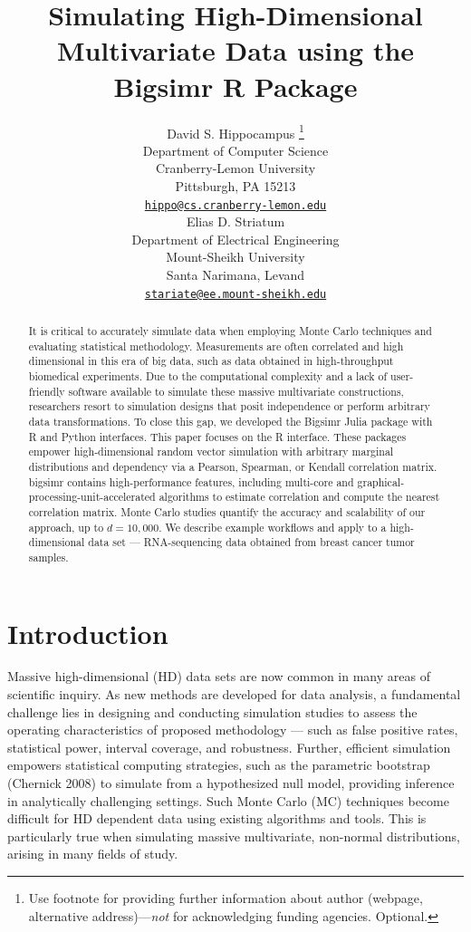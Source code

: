 \documentclass{article}
\title{Simulating High-Dimensional Multivariate Data using the Bigsimr R
Package}
\author{
    David S. Hippocampus
    \thanks{Use footnote for providing further information about author
(webpage, alternative address)---\emph{not} for acknowledging funding
agencies. Optional.}
   \\
    Department of Computer Science \\
    Cranberry-Lemon University \\
  Pittsburgh, PA 15213 \\
  \texttt{\href{mailto:hippo@cs.cranberry-lemon.edu}{\nolinkurl{hippo@cs.cranberry-lemon.edu}}} \\
   \And
    Elias D. Striatum
   \\
    Department of Electrical Engineering \\
    Mount-Sheikh University \\
  Santa Narimana, Levand \\
  \texttt{\href{mailto:stariate@ee.mount-sheikh.edu}{\nolinkurl{stariate@ee.mount-sheikh.edu}}} \\
  }
\begin{document}
\maketitle

\def\tightlist{}


\begin{abstract}
It is critical to accurately simulate data when employing Monte Carlo
techniques and evaluating statistical methodology. Measurements are
often correlated and high dimensional in this era of big data, such as
data obtained in high-throughput biomedical experiments. Due to the
computational complexity and a lack of user-friendly software available
to simulate these massive multivariate constructions, researchers resort
to simulation designs that posit independence or perform arbitrary data
transformations. To close this gap, we developed the Bigsimr Julia
package with R and Python interfaces. This paper focuses on the R
interface. These packages empower high-dimensional random vector
simulation with arbitrary marginal distributions and dependency via a
Pearson, Spearman, or Kendall correlation matrix. bigsimr contains
high-performance features, including multi-core and
graphical-processing-unit-accelerated algorithms to estimate correlation
and compute the nearest correlation matrix. Monte Carlo studies quantify
the accuracy and scalability of our approach, up to \(d=10,000\). We
describe example workflows and apply to a high-dimensional data set ---
RNA-sequencing data obtained from breast cancer tumor samples.
\end{abstract}


\hypertarget{introduction}{%
\section{Introduction}\label{introduction}}

Massive high-dimensional (HD) data sets are now common in many areas of
scientific inquiry. As new methods are developed for data analysis, a
fundamental challenge lies in designing and conducting simulation
studies to assess the operating characteristics of proposed methodology
--- such as false positive rates, statistical power, interval coverage,
and robustness. Further, efficient simulation empowers statistical
computing strategies, such as the parametric bootstrap (Chernick 2008)
to simulate from a hypothesized null model, providing inference in
analytically challenging settings. Such Monte Carlo (MC) techniques
become difficult for HD dependent data using existing algorithms and
tools. This is particularly true when simulating massive multivariate,
non-normal distributions, arising in many fields of study.
\end{document}

